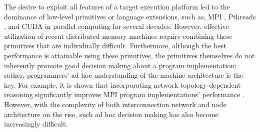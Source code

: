 \documentclass[ASNA,twocolumn]{USG} %
\begin{document}
The desire to {\color{red} exploit} all features of a target execution platform led to the dominance of low-level primitives or language extensions, such as, MPI \citep{Walker96mpi:a}, Pthreads \citep{10.5555/263953}, and CUDA \citep{Nickolls:2008:SPP:1365490.1365500} in parallel computing for several decades. However, effective utilization of recent distributed memory machines require combining these primitives that are individually difficult. Furthermore, although the best performance is attainable using these primitives, the primitives themselves do not inherently promote good decision making about a program implementation; rather, programmers' ad hoc understanding of the machine architecture is the key. For example, it is shown that incorporating network topology-dependent reasoning significantly improves MPI program implementations' performance \citep{10.1145/2488551.2488564}. However, with the complexity of both interconnection network and node architecture on the rise, such ad hoc decision making has also become increasingly difficult.
\end{document}
